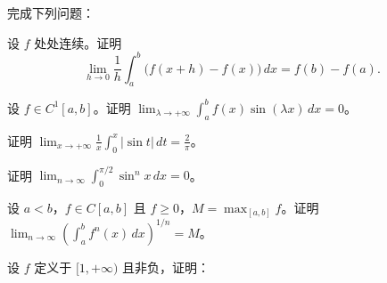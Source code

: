 \noindent\begin{minipage}{\textwidth}
完成下列问题：
\end{minipage}\par\vfill
\newpage
\noindent\begin{minipage}{\textwidth}
设 $f$ 处处连续。证明\[\lim_{h\to0}\frac1h\int_a^b\bigl(f(x+h)-f(x)\bigr)\,dx=f(b)-f(a).\]
\end{minipage}\par\vfill
\noindent\begin{minipage}{\textwidth}
设 $f\in C^1[a,b]$。证明 $\displaystyle\lim_{\lambda\to+\infty}\int_a^b f(x)\sin(\lambda x)\,dx=0$。
\end{minipage}\par\vfill
\noindent\begin{minipage}{\textwidth}
证明 $\displaystyle\lim_{x\to+\infty}\frac1x\int_0^x|\sin t|\,dt=\frac2\pi$。
\end{minipage}\par\vfill
\noindent\begin{minipage}{\textwidth}
证明 $\displaystyle\lim_{n\to\infty}\int_0^{\pi/2}\sin^n x\,dx=0$。
\end{minipage}\par\vfill
\newpage
\noindent\begin{minipage}{\textwidth}
设 $a<b$，$f\in C[a,b]$ 且 $f\ge0$，$M=\max_{[a,b]}f$。证明 $\displaystyle\lim_{n\to\infty}\left(\int_a^b f^n(x)\,dx\right)^{1/n}=M$。
\end{minipage}\par\vfill
\noindent\begin{minipage}{\textwidth}
设 $f$ 定义于 $[1,+\infty)$ 且非负，证明：
\end{minipage}\par\vfill
